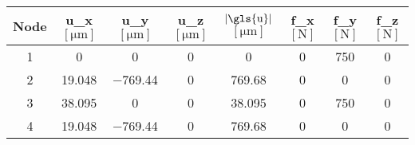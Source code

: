 \begin{tabular}{cccccccc}
    \toprule
    Node & \gls{u_x} $\left[\unit{\micro\meter}\right]$ & \gls{u_y} $\left[\unit{\micro\meter}\right]$ & \gls{u_z} $\left[\unit{\micro\meter}\right]$ & $\left|\text{\gls{u}}\right|$ $\left[\unit{\micro\meter}\right]$ & \gls{f_x} $\left[\unit{\newton}\right]$ & \gls{f_y} $\left[\unit{\newton}\right]$ & \gls{f_z} $\left[\unit{\newton}\right]$ \\
    \midrule
    \num{1} & \num{0} & \num{0} & \num{0} & \num{0} & \num{0} & \num{750} & \num{0} \\
    \num{2} & \num{19.048} & \num{-769.44} & \num{0} & \num{769.68} & \num{0} & \num{0} & \num{0} \\
    \num{3} & \num{38.095} & \num{0} & \num{0} & \num{38.095} & \num{0} & \num{750} & \num{0} \\
    \num{4} & \num{19.048} & \num{-769.44} & \num{0} & \num{769.68} & \num{0} & \num{0} & \num{0} \\
    \bottomrule
\end{tabular}